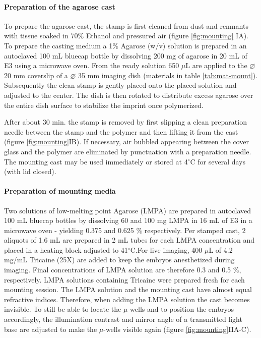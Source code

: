 \documentclass[11pt,singlespacinge,twoside]{reedthesis} %
\theoremstyle{definition}
\theoremstyle{definition}
\theoremstyle{definition}
\theoremstyle{remark}
\begin{document}
\hypertarget{preparation-of-the-agarose-cast}{%
\paragraph{Preparation of the agarose cast}\label{preparation-of-the-agarose-cast}}

To prepare the agarose cast, the stamp is first cleaned from dust and remnants with tissue soaked in 70\(\%\) Ethanol and pressured air (figure \ref{fig:mounting} IA). To prepare the casting medium a 1\(\%\) Agarose (w/v) solution is prepared in an autoclaved 100 mL bluecap bottle by dissolving 200 mg of agarose in 20 mL of E3 using a microwave oven. From the ready solution 650 \(\mu\)L are applied to the \(\varnothing\) 20 mm coverslip of a \(\varnothing\) 35 mm imaging dish (materials in table \ref{tab:mat-mount}). Subsequently the clean stamp is gently placed onto the placed solution and adjusted to the center. The dish is then rotated to distribute excess agarose over the entire dish surface to stabilize the imprint once polymerized.

After about 30 min. the stamp is removed by first slipping a clean preparation needle between the stamp and the polymer and then lifting it from the cast (figure \ref{fig:mounting}IB). If necessary, air bubbled appearing between the cover glass and the polymer are eliminated by punctuation with a preparation needle. The mounting cast may be used immediately or stored at 4\(^\circ\)C for several days (with lid closed).

\hypertarget{preparation-of-mounting-media}{%
\paragraph{Preparation of mounting media}\label{preparation-of-mounting-media}}

Two solutions of low-melting point Agarose (LMPA) are prepared in autoclaved 100 mL bluecap bottles by dissolving 60 and 100 mg LMPA in 16 mL of E3 in a microwave oven - yielding 0.375 and 0.625 \(\%\) respectively. Per stamped cast, 2 aliquots of 1.6 mL are prepared in 2 mL tubes for each LMPA concentration and placed in a heating block adjusted to 41\(^\circ\)C.For live imaging, 400 \(\mu\)L of 4.2 mg/mL Tricaine (25X) are added to keep the embryos anesthetized during imaging. Final concentrations of LMPA solution are therefore 0.3 and 0.5 \(\%\), respectively. LMPA solutions containing Tricaine were prepared fresh for each mounting session. The LMPA solution and the mounting cast have almost equal refractive indices. Therefore, when adding the LMPA solution the cast becomes invisible. To still be able to locate the \(\mu\)-wells and to position the embryos accordingly, the illumination contrast and mirror angle of a transmitted light base are adjusted to make the \(\mu\)-wells visible again (figure \ref{fig:mounting}IIA-C).
\end{document}
